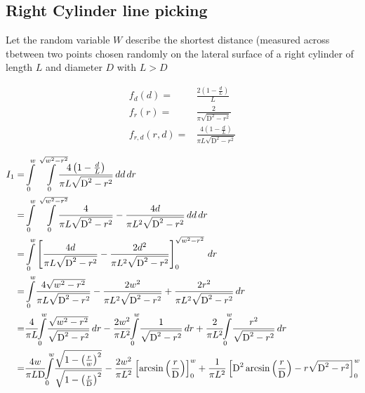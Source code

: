 \subsection{Right Cylinder line picking}
\label{sec:cylinder_line}

Let the random variable $W$ describe the shortest distance (measured across tbetween two points chosen randomly on the lateral surface of a right cylinder of length $L$ and diameter $D$ with $L >D$ 


\begin{align*}
f_{d}(d)=&\frac{2 \left(1-\frac{d}{L}\right)}{L}\\
f_{r}(r)=&\frac{2}{\pi  \sqrt{\text{D}^2-r^2}}\\
f_{r,d}(r,d)=&\frac{4 \left(1-\frac{d}{L}\right)}{\pi  L \sqrt{\text{D}^2-r^2}}
\end{align*}

\begin{align*}
I_{1}=&\intop_{0}^{w}
\intop_{0}^{\sqrt{w^{2}-r^{2}}}\!\!\!\!\!\!
\frac{4 \left(1-\frac{d}{L}\right)}{\pi  L \sqrt{\text{D}^2-r^2}}\,dd\,dr\\
=&\intop_{0}^{w}
\intop_{0}^{\sqrt{w^{2}-r^{2}}}\!\!\!\!\!\!
\frac{4}{\pi  L \sqrt{\text{D}^2-r^2}} 
-\frac{4 d}{\pi  L^{2} \sqrt{\text{D}^2-r^2}}
\,dd\,dr\\
=&\intop_{0}^{w}
\left[
\frac{4 d}{\pi  L \sqrt{\text{D}^2-r^2}} 
-\frac{2 d^{2}}{\pi  L^{2} \sqrt{\text{D}^2-r^2}}
\right]_{0}^{\sqrt{w^{2}-r^{2}}}
\,dr\\
=&
\intop_{0}^{w}\!
\frac{4 \sqrt{w^2-r^2}}{\pi  L\sqrt{\text{D}^2-r^2}}
-\frac{2 w^2}{\pi  L^2 \sqrt{\text{D}^2-r^2}}
+\frac{2 r^2}{\pi  L^2\sqrt{\text{D}^2-r^2}}
\,dr\\
=&
\frac{4}{\pi  L}\!\!
\intop_{0}^{w}\!
\frac{\sqrt{w^2-r^2}}{\sqrt{\text{D}^2-r^2}}
\,dr
-\frac{2 w^2}{\pi  L^2 }\!\!
\intop_{0}^{w}\!
\frac{1}{\sqrt{\text{D}^2-r^2}}
\,dr
+\frac{2}{\pi  L^2}\!\!
\intop_{0}^{w}\!
\frac{r^2}{\sqrt{\text{D}^2-r^2}}
\,dr\\
=&
\frac{4 w}{\pi  L \text{D}}\!\!
\intop_{0}^{w}\!
\frac{\sqrt{1-\left(\frac{r}{w}\right)^2}}{\sqrt{1-\left(\frac{r}{\text{D}}\right)^2}}
-\frac{2 w^2}{\pi  L^2 }\left[
\arcsin\left(\frac{r}{\text{D}}\right)
\right]_{0}^{w}
+\frac{1}{\pi  L^2}\left[
\text{D}^{2}\arcsin\left(\frac{r}{\text{D}}\right)
-r\sqrt{\text{D}^2-r^2}
\right]_{0}^{w}\!\\
\end{align*}

